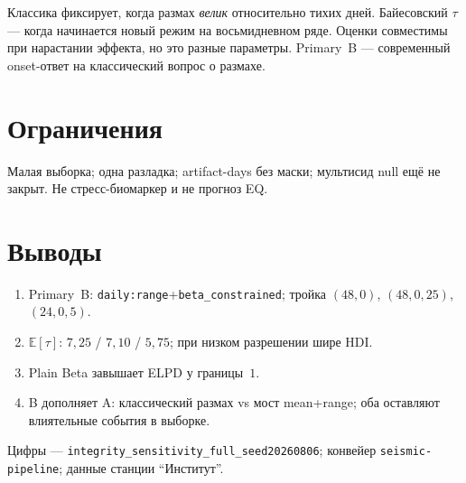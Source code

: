 \documentclass{article}
\begin{document}
Классика фиксирует, когда размах \emph{велик} относительно тихих
дней. Байесовский $\tau$ --- когда начинается новый режим на
восьмидневном ряде. Оценки совместимы при нарастании эффекта, но
это разные параметры. Primary~B --- современный onset-ответ на
классический вопрос о размахе.

\section{Ограничения}

Малая выборка; одна разладка; artifact-days без маски;
мультисид null ещё не закрыт. Не стресс-биомаркер и не прогноз EQ.

\section{Выводы}

\begin{enumerate}[leftmargin=1.2em,itemsep=0.3em]
  \item Primary~B: \texttt{daily:range}+\texttt{beta\_constrained};
  тройка $(48,0)$, $(48,0{,}25)$, $(24,0{,}5)$.
  \item $\mathbb{E}[\tau]$: $7{,}25$ / $7{,}10$ / $5{,}75$; при
  низком разрешении шире HDI.
  \item Plain Beta завышает ELPD у границы~$1$.
  \item B дополняет A: классический размах vs мост mean+range; оба
  оставляют влиятельные события в выборке.
\end{enumerate}

\begin{ack}
Цифры --- \texttt{integrity\_sensitivity\_full\_seed20260806};
конвейер \texttt{seismic-pipeline}; данные станции ``Институт''.
\end{ack}

{\small


}
\end{document}
